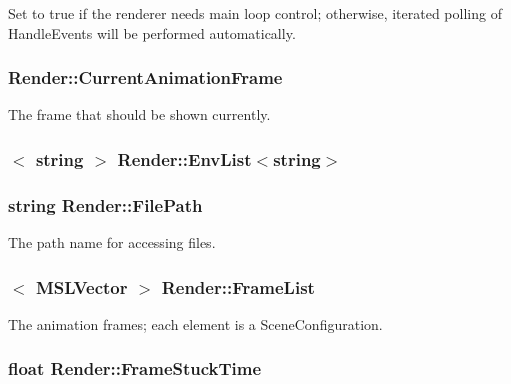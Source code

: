Set to true if the renderer needs main loop control; otherwise, iterated polling of Handle\-Events will be performed automatically.

\subsubsection{ Render::Current\-Animation\-Frame}\label{classRender_m10}


The frame that should be shown currently.

\subsubsection{$<$ string $>$ Render::Env\-List$<$string$>$\hspace{0.3cm}{\tt  [protected]}}\label{classRender_n3}


\subsubsection{\setlength{\rightskip}{0pt plus 5cm}string Render::File\-Path}\label{classRender_m0}


The path name for accessing files.

\subsubsection{$<$ {\bf MSLVector} $>$ Render::Frame\-List}\label{classRender_m1}


The animation frames; each element is a Scene\-Configuration.

\subsubsection{\setlength{\rightskip}{0pt plus 5cm}float Render::Frame\-Stuck\-Time}\label{classRender_m4}


